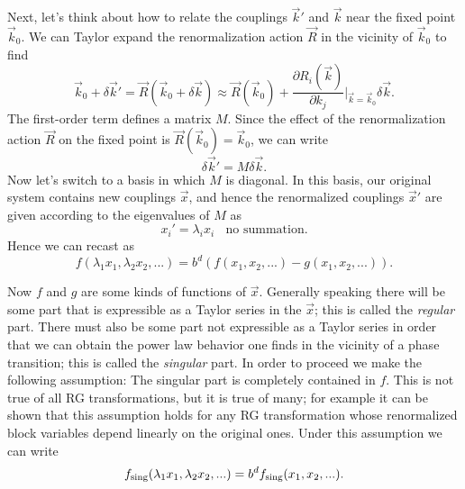 Next, let's think about how to relate the couplings $\vec{k}'$ and $\vec{k}$
near the fixed point $\vec{k}_0$. 
We can Taylor expand the renormalization action $\vec{R}$ in the vicinity of $\vec{k}_0$ to find
\begin{equation}
  \vec{k}_0+\delta\vec{k}'=\vec{R}\left(\vec{k}_0+\delta\vec{k}\right)
                          \approx\vec{R}(\vec{k}_0)
                           +\frac{\partial R_i(\vec{k})}{\partial k_j}
                              \Big|_{\vec{k}=\vec{k}_0}\delta\vec{k}.
\end{equation}
The first-order term defines a matrix $M$.
Since the effect of the renormalization action
$\vec{R}$ on the fixed point is $\vec{R}(\vec{k}_0)=\vec{k}_0$, we can write
\begin{equation}
  \delta\vec{k}'=M\delta\vec{k}.
\end{equation}
Now let's switch to a basis in which $M$ is diagonal. In this basis, our
original system contains new couplings $\vec{x}$, and hence the renormalized
couplings $\vec{x}'$ are given according to the eigenvalues of $M$ as
\begin{equation}
  x_i'=\lambda_i x_i~~~~\text{no summation}.
\end{equation}
Hence we can recast  as
\begin{equation}
f(\lambda_1x_1,\lambda_2x_2,...)=b^d\left(f(x_1,x_2,...)-g(x_1,x_2,...)\right).
\end{equation}


Now $f$ and $g$ are some kinds of functions of $\vec{x}$. Generally speaking
there will be some part that is expressible as a Taylor series in the $\vec{x}$;
this is called the {\it regular} part. There must also be some
part not expressible as a Taylor series in order that we can obtain the power
law behavior one finds in the vicinity of a phase transition; this is
called the {\it singular} part. In order to proceed we make
the following assumption: The singular part is completely contained in
$f$. This is not true of all RG transformations, but it is true
of many; for example it can be shown that this assumption holds for any
RG transformation whose renormalized block variables depend linearly
on the original ones. Under this assumption we can write
\begin{equation}
  f_{\text{sing}}(\lambda_1x_1,\lambda_2x_2,...)=b^df_{\text{sing}}(x_1,x_2,...).
\end{equation}


